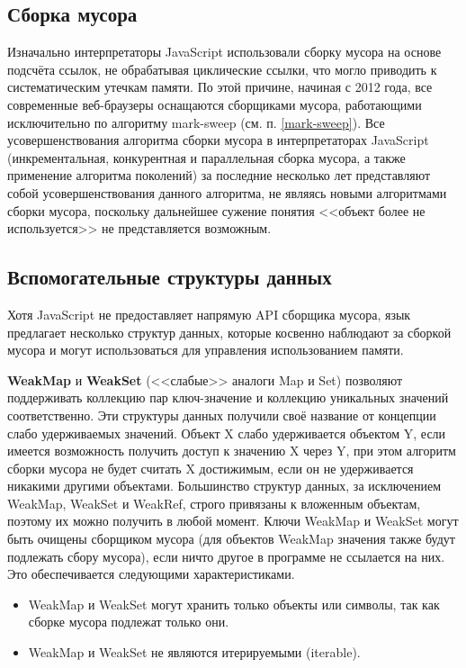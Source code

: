 \subsection{Сборка мусора}

Изначально интерпретаторы JavaScript использовали сборку мусора на основе подсчёта ссылок, не обрабатывая циклические ссылки, что могло приводить к систематическим утечкам памяти. По этой причине, начиная с 2012 года, все современные веб-браузеры оснащаются сборщиками мусора, работающими исключительно по алгоритму mark-sweep (см. п. \ref{mark-sweep}). Все усовершенствования алгоритма сборки мусора в интерпретаторах JavaScript (инкрементальная, конкурентная и параллельная сборка мусора, а также применение алгоритма поколений) за последние несколько лет представляют собой усовершенствования данного алгоритма, не являясь новыми алгоритмами сборки мусора, поскольку дальнейшее сужение понятия <<объект более не используется>> не представляется возможным. \cite{js_memory}



\subsection{Вспомогательные структуры данных}

Хотя JavaScript не предоставляет напрямую API сборщика мусора, язык предлагает несколько структур данных, которые косвенно наблюдают за сборкой мусора и могут использоваться для управления использованием памяти.~\cite{js_memory}

\textbf{WeakMap} и \textbf{WeakSet} (<<слабые>> аналоги Map и Set) позволяют поддерживать коллекцию пар ключ-значение и коллекцию уникальных значений соответственно. Эти структуры данных получили своё название от концепции слабо удерживаемых значений. Объект X слабо удерживается объектом Y, если имеется возможность получить доступ к значению X через Y, при этом алгоритм сборки мусора не будет считать X достижимым, если он не удерживается никакими другими объектами. Большинство структур данных, за исключением WeakMap, WeakSet и WeakRef, строго привязаны к вложенным объектам, поэтому их можно получить в любой момент. Ключи WeakMap и WeakSet могут быть очищены сборщиком мусора (для объектов WeakMap значения также будут подлежать сбору мусора), если ничто другое в программе не ссылается на них. Это обеспечивается следующими характеристиками. \cite{js_memory}

\begin{itemize}[label*=---]
	\item WeakMap и WeakSet могут хранить только объекты или символы, так как сборке мусора подлежат только они.
	\item WeakMap и WeakSet не являются итерируемыми (iterable).
\end{itemize}

